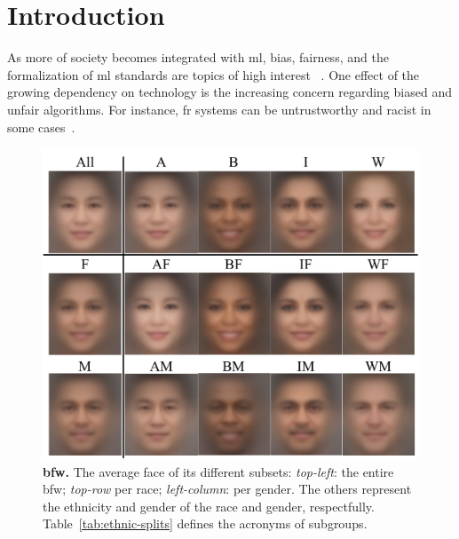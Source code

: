 
\glsresetall
\section{Introduction}
As more of society becomes integrated with \gls{ml}, bias, fairness, and the formalization of \gls{ml} standards are topics of high interest ~\cite{10.1007/978-3-030-13469-3_68, anne2018women, wang2018racial}. One effect of the growing dependency on technology is the increasing concern regarding biased and unfair algorithms.  For instance, \gls{fr} systems can be untrustworthy and racist in some cases~\cite{england2019,snow2018}.


\begin{figure}[t!]
\centering
         \includegraphics[trim=0in 0.2in 0in 0in,clip,width=.9\linewidth]{images/montage.pdf}  
\caption{\textbf{\gls{bfw}.} The average face of its different subsets: \emph{top-left}: the entire \gls{bfw}; \emph{top-row} per race;  \emph{left-column}: per gender. The others represent the ethnicity and gender of the race and gender, respectfully. Table~\ref{tab:ethnic-splits} defines the acronyms of subgroups.}
\label{fig:avg-faces}
\end{figure}

